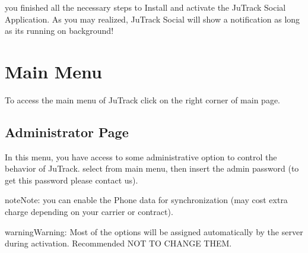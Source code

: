\documentclass[letterpaper,10pt,english]{sphinxmanual}
\begin{document}
\begin{DUlineblock}{0em}
\item[] 
\end{DUlineblock}

  you finished all the  necessary steps to Install and activate the JuTrack Social Application.
As you may realized, JuTrack Social will show a notification as long as its running on background!


\section{Main Menu}
\label{\detokenize{JuTrack_Social:main-menu}}
To access  the main menu of JuTrack click  on the right corner of main page.

\begin{DUlineblock}{0em}
\item[] 
\end{DUlineblock}



\subsection{Administrator Page}
\label{\detokenize{JuTrack_Social:administrator-page}}
In this menu, you have access to some administrative option to control the behavior of JuTrack.
select  from main menu, then insert the admin password (to get this password please contact us).

\begin{DUlineblock}{0em}
\item[] 
\end{DUlineblock}


\begin{sphinxadmonition}{note}{Note:}
you can enable the Phone data for synchronization (may cost extra charge depending on your carrier or contract).
\end{sphinxadmonition}

\begin{sphinxadmonition}{warning}{Warning:}
Most of the options will be assigned automatically by the server during activation. Recommended NOT TO CHANGE THEM.
\end{sphinxadmonition}
\end{document}
